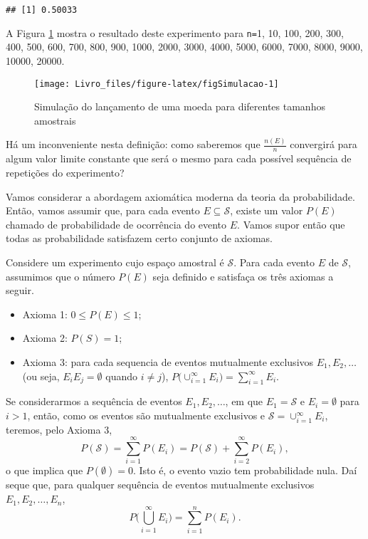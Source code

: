 \documentclass[]{book}
\providecommand{\tightlist}{%
  \setlength{\itemsep}{0pt}\setlength{\parskip}{0pt}}
\theoremstyle{definition}
\theoremstyle{definition}
\theoremstyle{definition}
\theoremstyle{remark}
\begin{document}
\begin{verbatim}
## [1] 0.50033
\end{verbatim}

A Figura \ref{fig:figSimulacao} mostra o resultado deste experimento para \texttt{n=}1, 10, 100, 200, 300, 400, 500, 600, 700, 800, 900, 1000, 2000, 3000, 4000, 5000, 6000, 7000, 8000, 9000, 10000, 20000.

\begin{figure}

{\centering \texttt{[image: Livro\_files/figure-latex/figSimulacao-1]} 

}

\caption{Simulação do lançamento de uma moeda para diferentes tamanhos amostrais}\label{fig:figSimulacao}
\end{figure}

Há um inconveniente nesta definição: como saberemos que \(\frac{n(E)}{n}\) convergirá para algum valor limite constante que será o mesmo para cada possível sequência de repetições do experimento?

Vamos considerar a abordagem axiomática moderna da teoria da probabilidade.
Então, vamos assumir que, para cada evento \(E \subseteq \mathcal{S}\), existe um valor \(P(E)\) chamado de probabilidade de ocorrência do evento \(E\).
Vamos supor então que todas as probabilidade satisfazem certo conjunto de axiomas.

Considere um experimento cujo espaço amostral é \(\mathcal{S}\).
Para cada evento \(E\) de \(\mathcal{S}\), assumimos que o número \(P(E)\) seja definido e satisfaça os três axiomas a seguir.

\begin{itemize}
\tightlist
\item
  Axioma 1: \(0 \leq P(E) \leq 1\);
\item
  Axioma 2: \(P(S) = 1\);
\item
  Axioma 3: para cada sequencia de eventos mutualmente exclusivos \(E_1, E_2, \ldots\) (ou seja, \(E_i E_j=\emptyset\) quando \(i\neq j\)), \(P\big(\cup_{i=1}^{\infty}E_i\big)=\sum_{i=1}^{\infty}E_i\).
\end{itemize}

Se considerarmos a sequência de eventos \(E_1, E_2, \ldots\), em que \(E_1=\mathcal{S}\) e \(E_i=\emptyset\) para \(i>1\), então, como os eventos são mutualmente exclusivos e \(\mathcal{S}=\cup_{i=1}^{\infty}E_i\), teremos, pelo Axioma 3,
\[P(\mathcal{S})=\sum_{i=1}^{\infty}P(E_i) = P(\mathcal{S}) + \sum_{i=2}^{\infty}P(E_i),\]
o que implica que \(P(\emptyset)=0\).
Isto é, o evento vazio tem probabilidade nula.
Daí seque que, para qualquer sequência de eventos mutualmente exclusivos \(E_1, E_2, \ldots, E_n\),
\[P\Bigg(\bigcup_{i=1}^{\infty}E_i\Bigg) = \sum_{i=1}^{n}P(E_i).\]
\end{document}
